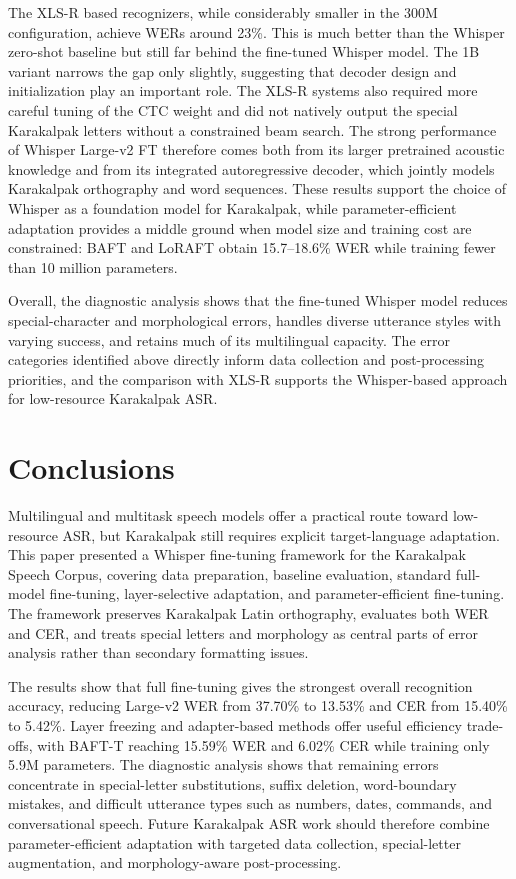 \documentclass[11pt]{article}
\begin{document}
The XLS-R based recognizers, while considerably smaller in the 300M configuration, achieve WERs around 23\%. This is much better than the Whisper zero-shot baseline but still far behind the fine-tuned Whisper model. The 1B variant narrows the gap only slightly, suggesting that decoder design and initialization play an important role. The XLS-R systems also required more careful tuning of the CTC weight and did not natively output the special Karakalpak letters without a constrained beam search. The strong performance of Whisper Large-v2 FT therefore comes both from its larger pretrained acoustic knowledge and from its integrated autoregressive decoder, which jointly models Karakalpak orthography and word sequences. These results support the choice of Whisper as a foundation model for Karakalpak, while parameter-efficient adaptation provides a middle ground when model size and training cost are constrained: BAFT and LoRAFT obtain 15.7--18.6\% WER while training fewer than 10 million parameters.

Overall, the diagnostic analysis shows that the fine-tuned Whisper model reduces special-character and morphological errors, handles diverse utterance styles with varying success, and retains much of its multilingual capacity. The error categories identified above directly inform data collection and post-processing priorities, and the comparison with XLS-R supports the Whisper-based approach for low-resource Karakalpak ASR.

\section{Conclusions}

Multilingual and multitask speech models offer a practical route toward low-resource ASR, but Karakalpak still requires explicit target-language adaptation. This paper presented a Whisper fine-tuning framework for the Karakalpak Speech Corpus, covering data preparation, baseline evaluation, standard full-model fine-tuning, layer-selective adaptation, and parameter-efficient fine-tuning. The framework preserves Karakalpak Latin orthography, evaluates both WER and CER, and treats special letters and morphology as central parts of error analysis rather than secondary formatting issues.

The results show that full fine-tuning gives the strongest overall recognition accuracy, reducing Large-v2 WER from 37.70\% to 13.53\% and CER from 15.40\% to 5.42\%. Layer freezing and adapter-based methods offer useful efficiency trade-offs, with BAFT-T reaching 15.59\% WER and 6.02\% CER while training only 5.9M parameters. The diagnostic analysis shows that remaining errors concentrate in special-letter substitutions, suffix deletion, word-boundary mistakes, and difficult utterance types such as numbers, dates, commands, and conversational speech. Future Karakalpak ASR work should therefore combine parameter-efficient adaptation with targeted data collection, special-letter augmentation, and morphology-aware post-processing.
\end{document}
